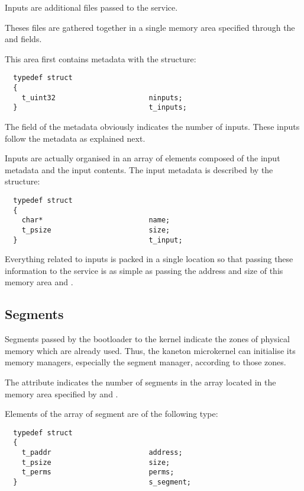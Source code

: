 Inputs are additional files passed to the  service.

Theses files are gathered together in a single memory area specified through
the  and  fields.

This area first contains metadata with the  structure:

\begin{verbatim}
  typedef struct
  {
    t_uint32                      ninputs;
  }                               t_inputs;
\end{verbatim}

The  field of the metadata obviously indicates the number
of inputs. These inputs follow the metadata as explained next.

Inputs are actually organised in an array of elements composed of the input
metadata and the input contents. The input metadata is described by the
 structure:

\begin{verbatim}
  typedef struct
  {
    char*                         name;
    t_psize                       size;
  }                               t_input;
\end{verbatim}

Everything related to inputs is packed in a single location so that passing
these information to the  service is as simple as passing the
address and size of this memory area \ie{}  and .


\subsection*{Segments}

Segments passed by the bootloader to the kernel indicate the zones of
physical memory which are already used. Thus, the kaneton microkernel can
initialise its memory managers, especially the segment manager, according
to those zones.

The  attribute indicates the number of segments in the
array located in the memory area specified by  and
.

Elements of the array of segment are of the following type:

\begin{verbatim}
  typedef struct
  {
    t_paddr                       address;
    t_psize                       size;
    t_perms                       perms;
  }                               s_segment;
\end{verbatim}

